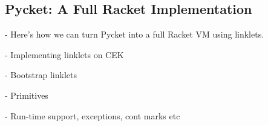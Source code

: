 \newpage

\subsection{Pycket: A Full Racket Implementation}
\label{subsec:pycket}

- Here's how we can turn Pycket into a full Racket VM using linklets.

- Implementing linklets on CEK

- Bootstrap linklets

- Primitives

- Run-time support, exceptions, cont marks etc
